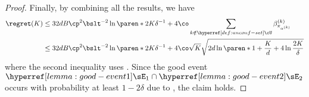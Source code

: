 \begin{proof}
Finally, by combining all the results, we have
\begin{align*}
\regret(K) &\leq 
32dB \cp^2\bslt^{-2}\ln\paren*{2K\delta^{-1}} 
+ 4\co \sum_{k\notin \unconfBandit} \beta^{(k)}_{\pi_{\alpha^{(k)}}}\\
&\leq 
32dB \cp^2\bslt^{-2}\ln\paren*{2K\delta^{-1}} +
4\co \sqrt{K} \sqrt{2d\ln \paren*{1 + \frac{K}{d}} + 4 \ln \frac{2K}{\delta}}
\end{align*}
where the second inequality uses .
Since the good event $\rmvEventBandit \cap \confeventBandit$ occurs with probability at least $1 - 2\delta$ due to , the claim holds.
\end{proof}
